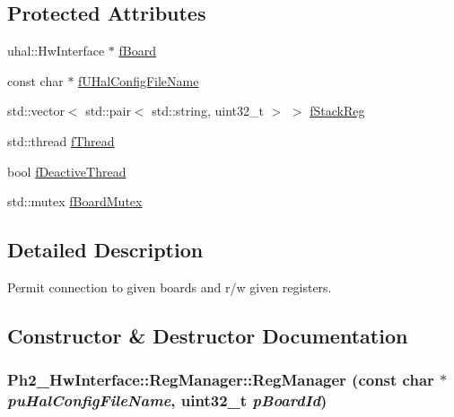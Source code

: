 \subsection*{Protected Attributes}
\begin{CompactItemize}
\item 
uhal::Hw\-Interface $\ast$ \hyperlink{class_ph2___hw_interface_1_1_reg_manager_0d4908ec834a3a0b7d8139872fd0a4a0}{f\-Board}
\item 
const char $\ast$ \hyperlink{class_ph2___hw_interface_1_1_reg_manager_aaa29ca65c283acc645132c7bef0f24f}{f\-UHal\-Config\-File\-Name}
\item 
std::vector$<$ std::pair$<$ std::string, uint32\_\-t $>$ $>$ \hyperlink{class_ph2___hw_interface_1_1_reg_manager_2302b9eaa5f8edfbaa5cc8d844265833}{f\-Stack\-Reg}
\item 
std::thread \hyperlink{class_ph2___hw_interface_1_1_reg_manager_3aa2f1c4769f122a2e902f2d70865b30}{f\-Thread}
\item 
bool \hyperlink{class_ph2___hw_interface_1_1_reg_manager_e337041a55b10db74bbd8e171424807a}{f\-Deactive\-Thread}
\item 
std::mutex \hyperlink{class_ph2___hw_interface_1_1_reg_manager_b5fdbe722820897d3a1344f300cc4a92}{f\-Board\-Mutex}
\end{CompactItemize}


\subsection{Detailed Description}
Permit connection to given boards and r/w given registers. 



\subsection{Constructor \& Destructor Documentation}
\hypertarget{class_ph2___hw_interface_1_1_reg_manager_fc90c93f9e6771d2bf841883567b9eeb}{
\subsubsection[RegManager]{\setlength{\rightskip}{0pt plus 5cm}Ph2\_\-Hw\-Interface::Reg\-Manager::Reg\-Manager (const char $\ast$ {\em pu\-Hal\-Config\-File\-Name}, uint32\_\-t {\em p\-Board\-Id})}}
\label{class_ph2___hw_interface_1_1_reg_manager_fc90c93f9e6771d2bf841883567b9eeb}


